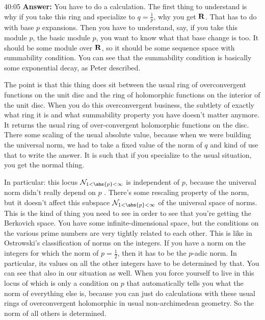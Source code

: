 \begin{example}
\begin{unfinished}{40:05}
\textbf{Answer:} You have to do a calculation. The first thing to understand is why if you take this ring and specialize to $q = \frac{1}{p}$, why you get $\mathbf R$. That has to do with base $p$ expansions. Then you have to understand, say, if you take this module $p$, the basic module $p$, you want to know what that base change is too. It should be some module over $\mathbf R$, so it should be some sequence space with summability condition. 
You can see that the summability condition is basically some exponential decay, as Peter described.

The point is that this thing does sit between the usual ring of overconvergent functions on the unit disc and the ring of holomorphic functions on the interior of the unit disc. When you do this overconvergent business, the subtlety of exactly what ring it is and what summability property you have doesn't matter anymore. It returns the usual ring of over-convergent holomorphic functions on the disc. There some scaling of the usual absolute value, because when we were building the universal norm, we had to take a fixed value of the norm of $q$ and kind of use that to write the answer. 
It is such that if you specialize to the usual situation, you get the normal thing.

In particular: this locus $\mathcal{N}_{1 < \abs{p} < \infty} $ is independent of $p$, because the universal norm didn't really depend on $p$ . There's some rescaling property of the norm, but it doesn't affect this subspace $\mathcal{N}_{1 < \abs{p} < \infty} $ of the universal space of norms. This is the kind of thing you need to see in order to see that you're getting the Berkovich space. You have some infinite-dimensional space, but the conditions on the various prime numbers are very tightly related to each other. This is like in Ostrowski's classification of norms on the integers.
If you have a norm on the integers for which the norm of $p = \frac{1}{2}$, then it has to be the $p$-adic norm. In particular, its values on all the other integers have to be determined by that. You can see that also in our situation as well. When you force yourself to live in this locus of  which is only a condition on $p$ that automatically tells you what the norm of everything else is, because you can just do calculations with these usual rings of overconvergent holomorphic in usual non-archimedean geometry. So the norm of all others is determined.


\end{unfinished}
\end{example}
